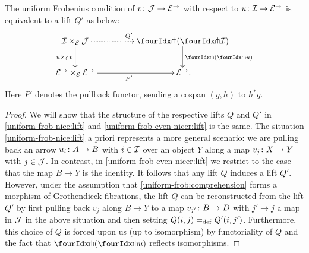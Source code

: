 \documentclass[reqno,10pt,a4paper,oneside,draft]{amsart}
\begin{document}
\begin{proposition}
\label{uniform-frob-even-nicer}
The uniform Frobenius condition of $v \co \cal{J} \to \cal{E}^\to$ with respect to $u \co \cal{I} \to \cal{E}^\to$ is equivalent to a lift $Q'$ as below:
\begin{equation} \label{uniform-frob-even-nicer:lift}
\begin{gathered}
\xymatrix@C+2em{
  \cal{I} \times_{\cal{E}} \cal{J}
  \ar@{.>}[r]^{Q'}
  \ar[d]_{u \times_{\cal{E}} v}
&
  \liftl{(\liftr{\cal{I}})}
  \ar[d]^{\liftl{(\liftr{u})}}
\\
  \cal{E}^\to \times_{\cal{E}} \cal{E}^\to
  \ar[r]_{P'}
&
  \cal{E}^\to
\rlap{.}}
\end{gathered}
\end{equation}
Here $P'$ denotes the pullback functor, sending a cospan $(g, h)$ to $h^* g$.
\end{proposition}

\begin{proof}
We will show that the structure of the respective lifts $Q$ and $Q'$ in \eqref{uniform-frob-nice:lift} and \eqref{uniform-frob-even-nicer:lift} is the same.
The situation \eqref{uniform-frob-nice:lift} a priori represents a more general scenario: we are pulling back an arrow $u_i \co A \to B$ with $i \in \cal{I}$ over an object $Y$ along a map $v_j \co X \to Y$ with $j \in \cal{J}$.
In contrast, in \eqref{uniform-frob-even-nicer:lift} we restrict to the case that the map $B \to Y$ is the identity.
It follows that any lift $Q$ induces a lift $Q'$.
However, under the assumption that \eqref{uniform-frob:comprehension} forms a morphism of Grothendieck fibrations, the lift $Q$ can be reconstructed from the lift $Q'$ by first pulling back $v_j$ along $B \to Y$ to a map $v_{j'} \co B \to D$ with $j' \to j$ a map in $\cal{J}$ in the above situation and then setting $Q(i, j) \defeq Q'(i, j')$.
Furthermore, this choice of $Q$ is forced upon us (up to isomorphism) by functoriality of $Q$ and the fact that $\liftl{(\liftr{u})}$ reflects isomorphisms.
\end{proof}
\end{document}
